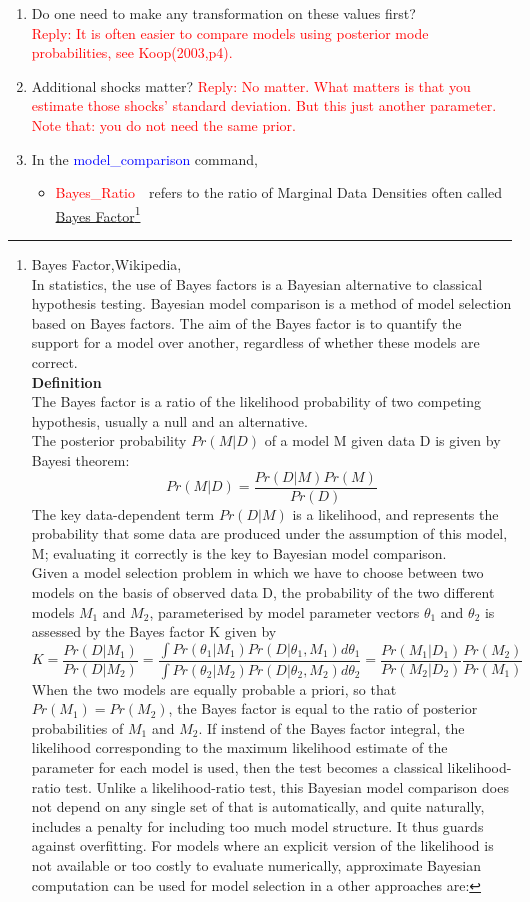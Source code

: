 \documentclass[cn,10pt,math=newtx,citestyle=gb7714-2015,bibstyle=gb7714-2015]{elegantbook}
\begin{document}
{{\begin{enumerate}
		
		\item Do one need to make any transformation on these values first?\\
		\textcolor{red}{Reply: It is often easier to compare models using posterior mode probabilities, see Koop(2003,p4).}
		
		\item Additional shocks matter?
		\textcolor{red}{Reply: No matter. What matters is that you estimate those shocks' standard deviation. But this just another parameter. Note that: you do not need the same prior.}
		
		\item In the \textcolor{blue}{model\_comparison} command,
		\begin{itemize}
			\item \textcolor{red}{Bayes\_Ratio}~~refers to the ratio of Marginal Data Densities often called \underline{Bayes Factor}\footnote{Bayes Factor,Wikipedia,\\In statistics, the use of Bayes factors is a Bayesian alternative to classical hypothesis testing. Bayesian model comparison is a method of model selection based on Bayes factors. The aim of the Bayes factor is to quantify the support for a model over another, regardless of whether these models are correct.\\
				\textbf{Definition}\\
				The Bayes factor is a ratio of the likelihood probability of two competing hypothesis, usually a null and an alternative.\\
				The posterior probability $Pr(M|D)$ of a model M given data D is given by Bayesi theorem:
				$$Pr(M|D)=\frac{Pr(D|M)Pr(M)}{Pr(D)}$$
				The key data-dependent term $Pr(D|M)$ is a likelihood, and represents the probability that some data are produced under the assumption of this model, M; evaluating it correctly is the key to Bayesian model comparison.\\
				Given a model selection problem in which we have to choose between two models on the basis of observed data D, the probability of the two different models $M_1$ and $M_2$, parameterised by model parameter vectors $\theta_1$ and $\theta_2$ is assessed by the Bayes factor K given by
				$$K=\frac{Pr(D|M_1)}{Pr(D|M_2)}=\frac{\int Pr(\theta_1|M_1)Pr(D|\theta_1,M_1)d\theta_1}{\int Pr(\theta_2|M_2)Pr(D|\theta_2,M_2)d\theta_2}=\frac{Pr(M_1|D_1)}{Pr(M_2|D_2)}\frac{Pr(M_2)}{Pr(M_1)}$$
				When the two models are equally probable a priori, so that $Pr(M_1)=Pr(M_2)$, the Bayes factor is equal to the ratio of posterior probabilities of $M_1$ and $M_2$. If instend of the Bayes factor integral, the likelihood corresponding to the maximum likelihood estimate of the parameter for each model is used, then the test becomes a classical likelihood-ratio test. Unlike a likelihood-ratio test, this Bayesian model comparison does not depend on any single set of that is automatically, and quite naturally, includes a penalty for including too much model structure. It thus guards against overfitting. For models where an explicit version of the likelihood is not available or too costly to evaluate numerically, approximate Bayesian computation can be used for model selection in a other approaches are:
}
\end{itemize}
\end{enumerate}}}
\end{document}
